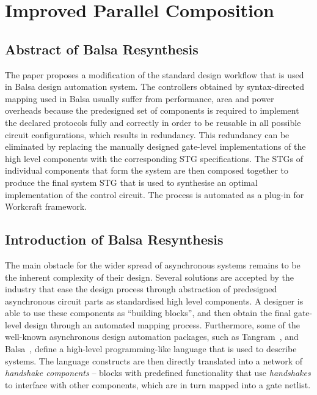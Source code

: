 \section{Improved Parallel Composition}\label{sec_intro}

\subsection{Abstract of Balsa Resynthesis}

The paper proposes a modification of the standard design workflow
that is used in Balsa design automation system. The controllers obtained
by syntax-directed mapping used in Balsa usually suffer from performance,
area and power overheads because the predesigned set of components
is required to implement the declared protocols fully and correctly
in order to be reusable in all possible circuit configurations, which
results in redundancy. This redundancy can be eliminated by replacing
the manually designed gate-level implementations of the high level
components with the corresponding STG specifications. The STGs of
individual components that form the system are then composed together
to produce the final system STG that is used to synthesise an optimal
implementation of the control circuit. The process is automated as
a plug-in for Workcraft framework.

\subsection{Introduction of Balsa Resynthesis\label{sec:Balsa-Introduction}}

The main obstacle for the wider spread of asynchronous systems remains
to be the inherent complexity of their design. Several solutions are
accepted by the industry that ease the design process through abstraction
of predesigned asynchronous circuit parts as standardised high level
components. A designer is able to use these components as ``building
blocks'', and then obtain the final gate-level design through an
automated mapping process. Furthermore, some of the well-known asynchronous
design automation packages, such as Tangram~\cite{951597}, and Balsa~\cite{balsa},
define a high-level programming-like language that is used to describe
systems. The language constructs are then directly translated into
a network of \emph{handshake components }-- blocks with predefined
functionality that use \emph{handshakes} to interface with other components,
which are in turn mapped into a gate netlist. 

